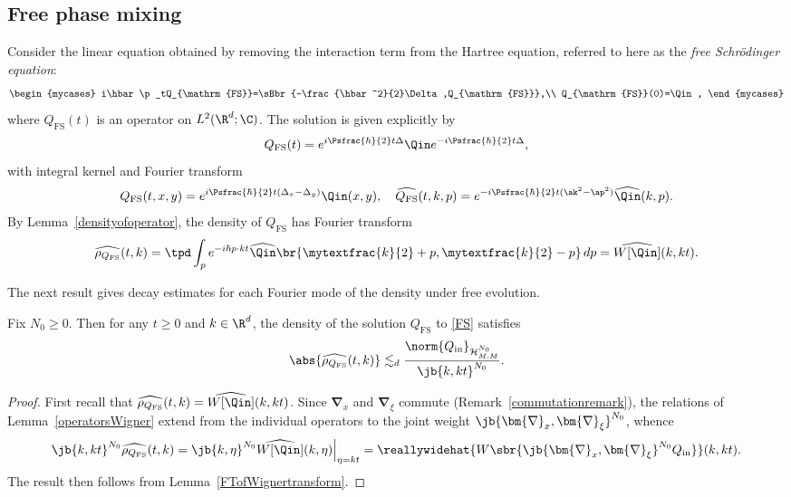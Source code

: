 \subsection{Free phase mixing}\label{freephasemixingsection} Consider the linear equation obtained by removing the interaction term from the Hartree equation, referred to here as the \textit{free Schrödinger equation}:
\begin{align}\label{FS}
\begin{mycases}
i\hbar\p_tQ_{\mathrm{FS}}=\sBbr{-\frac{\hbar^2}{2}\Delta,Q_{\mathrm{FS}}},\\
Q_{\mathrm{FS}}(0)=\Qin,
\end{mycases}
\end{align}
where ${Q_{\mathrm{FS}}}(t)$ is an operator on $L^2(\R^d;\C)$. The solution is given explicitly by
\begin{align}
{Q_{\mathrm{FS}}}(t)=e^{i\Psfrac{\hbar}{2} t\Delta}\Qin e^{-i \Psfrac{\hbar}{2} t\Delta},\label{FSsol}
\end{align}with integral kernel and Fourier transform
\begin{align*}
{Q_{\mathrm{FS}}}(t,x,y)=e^{i {\Psfrac{\hbar}{2}} t(\Delta_x-\Delta_y)}\Qin(x,y),\quad\widehat{Q_{\mathrm{FS}}}(t,k,p)=e^{-i {\Psfrac{\hbar}{2}} t(\ak^2-\ap^2)}\widehat\Qin(k,p).
\end{align*}
By Lemma~\ref{densityofoperator}, the density of $Q_{\mathrm{FS}}$ has Fourier transform
\begin{align*}
\widehat{\rho_{{Q_{\mathrm{FS}}}}}(t,k)=\tpd\int_pe^{-i \hbar p\cdot kt}\widehat \Qin\br{\mytextfrac{k}{2}+p,\mytextfrac{k}{2}-p}\,dp =\widehat{W[\Qin]}(k,kt).
\end{align*}

The next result gives decay estimates for each Fourier mode of the density under free evolution.
\begin{proposition} \label{propfreephasemixing}
Fix $N_0\geq0$. Then for any $t\geq0$ and $k\in\R^d$, the density of the solution $Q_{\mathrm{FS}}$ to \eqref{FS} satisfies
\begin{align*}
\abs{\widehat{\rho_{{Q_{\mathrm{FS}}}}}(t,k)}\lesssim_d\frac{ \norm{Q_{\mathrm{in}}}_{\mathcal H^{N_0}_{M,M}}}{\jb{k,kt}^{N_0}}.
\end{align*}
\end{proposition}
\begin{proof}
First recall that $\widehat{\rho_{Q_{\mathrm{FS}}}}(t,k)=\widehat{W[\Qin]}(k,kt)$. Since $\bm{\nabla}_x$ and $\bm{\nabla}_\xi$ commute (Remark~\ref{commutationremark}), the relations of Lemma~\ref{operatorsWigner} extend from the individual operators to the joint weight $\jb{\bm{\nabla}_x,\bm{\nabla}_\xi}^{N_0}$, whence
\begin{align*}
\jb{k,kt}^{N_0}\widehat{\rho_{Q_{\mathrm{FS}}}}(t,k)=\jb{k,\eta}^{N_0}\widehat{W[\Qin]}(k,\eta)\Big|_{\eta=kt}=\reallywidehat{W\sbr{\jb{\bm{\nabla}_x,\bm{\nabla}_{\xi}}^{N_0}Q_{\mathrm{in}}}}(k,kt).
\end{align*}
The result then follows from Lemma~\ref{FTofWignertransform}.
\end{proof}

